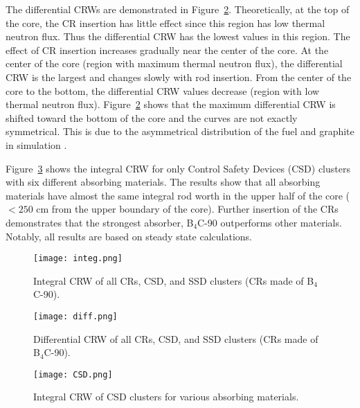 The differential CRWs are demonstrated in Figure~\ref{fig:diff}. Theoretically, at the top of the core, the CR insertion has little effect since this region has low thermal neutron flux. Thus the differential CRW has the lowest values in this region. The effect of CR insertion increases gradually near the center of the core. At the center of the core (region with maximum thermal neutron flux), the differential CRW is the largest and changes slowly with rod insertion. From the center of the core to the bottom, the differential CRW values decrease (region with low thermal neutron flux). Figure~\ref{fig:diff} shows that the maximum differential CRW is shifted toward the bottom of the core and the curves are not exactly symmetrical. This is due to the asymmetrical distribution of the fuel and graphite in simulation \cite{xuemei2013study,son2016control}.

Figure~\ref{fig:CSD} shows the integral CRW for only Control Safety Devices (CSD) clusters with six 
different absorbing materials. The results show that all absorbing materials 
have almost the same integral rod worth in the upper half of the core 
($<250$ cm from the upper boundary of the core). Further insertion of the 
CRs demonstrates that the strongest absorber, B$_4$C-90 outperforms other materials.
Notably, all results are based on steady state calculations. 

\begin{figure}
	\centering
	\texttt{[image: integ.png]}
	\vspace{-0.5in}
	\caption{Integral CRW of all CRs, CSD, and SSD clusters (CRs made of B$_4$C-90).} 
	\label{fig:integ}
\end{figure}
\begin{figure}
	\centering
	\texttt{[image: diff.png]}
	\vspace{-0.5in}
	\caption{Differential CRW of all CRs, CSD, and SSD clusters (CRs made of B$_4$C-90).} 
	\label{fig:diff}
\end{figure}
\begin{figure}
	\centering
	\texttt{[image: CSD.png]}
	\vspace{-0.5in}
	\caption{Integral CRW of CSD clusters for various absorbing materials.} 
	\label{fig:CSD}
\end{figure}